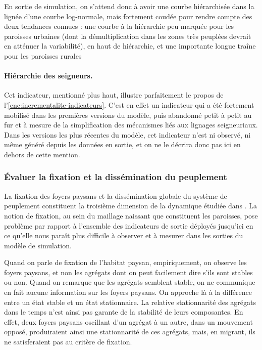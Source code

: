 En sortie de simulation, on s'attend donc à avoir une courbe hiérarchisée dans la lignée d'une courbe log-normale, mais fortement \og coudée\fg{} pour rendre compte des deux tendances connues :
	une courbe à la hiérarchie peu marquée pour les paroisses urbaines (dont la démultiplication dans les zones très peuplées devrait en atténuer la variabilité), en haut de hiérarchie, et une importante \og longue traîne\fg{} pour les paroisses \og rurales\fg{}

\paragraph{Hiérarchie des seigneurs.}
Cet indicateur, mentionné plus haut, illustre parfaitement le propos de l'\cref{enc:incrementalite-indicateurs}.
C'est en effet un indicateur qui a été fortement mobilisé dans les premières versions du modèle, puis abandonné petit à petit au fur et à mesure de la simplification des mécanismes liés aux lignages seigneuriaux.
Dans les versions les plus récentes du modèle, cet indicateur n'est ni observé, ni même généré depuis les données en sortie, et on ne le décrira donc pas ici en dehors de cette mention.

\subsubsection{Évaluer la fixation et la dissémination du peuplement}

La fixation des foyers paysans et la dissémination globale du système de peuplement constituent la troisième dimension de la dynamique étudiée dans \simfeodal{}.
La notion de fixation, au sein du maillage naissant que constituent les paroisses, pose problème par rapport à l'ensemble des indicateurs de sortie déployés jusqu'ici en ce qu'elle nous paraît plus difficile à observer et à mesurer dans les sorties du modèle de simulation.

Quand on parle de fixation de l'habitat paysan, empiriquement, on observe les foyers paysans, et non les agrégats dont on peut facilement dire s'ils sont stables ou non.
Quand on remarque que les agrégats semblent stable, on ne communique en fait aucune information sur les foyers paysans.
On approche là à la différence entre un état stable et un état stationnaire.
La relative stationnarité des agrégats dans le temps n'est ainsi pas garante de la stabilité de leurs composantes.
En effet, deux foyers paysans oscillant d'un agrégat à un autre, dans un mouvement opposé, produiraient ainsi une stationnarité de ces agrégats, mais, en migrant, ils ne satisferaient pas au critère de fixation.

